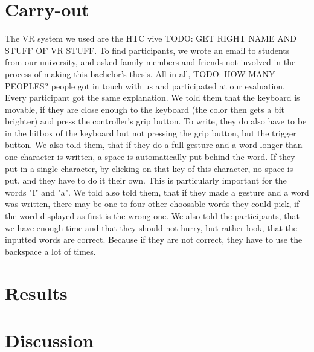 \section{Carry-out}
The VR system we used are the HTC vive TODO: GET RIGHT NAME AND STUFF OF VR STUFF.
To find participants, we wrote an email to students from our university, and asked family members and friends not involved in the process of making this bachelor's thesis. All in all, TODO: HOW MANY PEOPLES? people got in touch with us and participated at our evaluation. Every participant got the same explanation. We told them that the keyboard is movable, if they are close enough to the keyboard (the color then gets a bit brighter) and press the controller's grip button. To write, they do also have to be in the hitbox of the keyboard but not pressing the grip button, but the trigger button. We also told them, that if they do a full gesture and a word longer than one character is written, a space is automatically put behind the word. If they put in a single character, by clicking on that key of this character, no space is put, and they have to do it their own. This is particularly important for the words "I" and "a". We told also told them, that if they made a gesture and a word was written, there may be one to four other choosable words they could pick, if the word displayed as first is the wrong one. We also told the participants, that we have enough time and that they should not hurry, but rather look, that the inputted words are correct. Because if they are not correct, they have to use the backspace a lot of times.\\

\section{Results}



\section{Discussion}